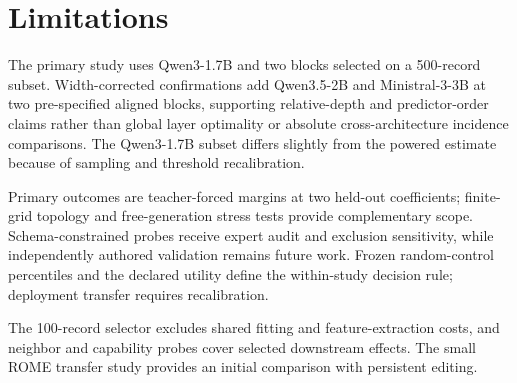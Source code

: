 \section{Limitations}

The primary study uses Qwen3-1.7B and two blocks selected on a 500-record
subset. Width-corrected confirmations add Qwen3.5-2B and Ministral-3-3B at
two pre-specified aligned blocks, supporting relative-depth and predictor-order
claims rather than global layer optimality or absolute cross-architecture
incidence comparisons. The Qwen3-1.7B subset differs slightly from the powered
estimate because of sampling and threshold recalibration.

Primary outcomes are teacher-forced margins at two held-out coefficients;
finite-grid topology and free-generation stress tests provide complementary
scope. Schema-constrained probes receive expert audit and exclusion
sensitivity, while independently authored validation remains future work.
Frozen random-control percentiles and the declared utility define the
within-study decision rule; deployment transfer requires recalibration.

The 100-record selector excludes shared fitting and feature-extraction costs,
and neighbor and capability probes cover selected downstream effects. The small
ROME transfer study provides an initial comparison with persistent editing.
